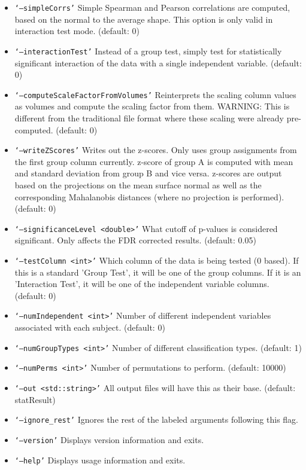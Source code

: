 \documentclass{InsightArticle}
\begin{document}
\begin{itemize}
     	\item \texttt{\small {`--simpleCorrs'}}  Simple Spearman and Pearson correlations are computed, based on the normal to the average shape. This option is only valid in interaction test mode. (default: 0)
     	\item \texttt{\small {`--interactionTest'}}  Instead of a group test, simply test for statistically significant interaction of the data with a single independent variable. (default:
     0)
     	\item \texttt{\small {`--computeScaleFactorFromVolumes'}}  Reinterprets the scaling column values as volumes and compute the scaling factor from them. WARNING: This is different from the traditional file format where these scaling were already pre-computed. (default: 0)
     	\item \texttt{\small {`--writeZScores'}}  Writes out the z-scores. Only uses group assignments from the first group column currently. z-score of group A is computed with mean and standard deviation from group B and vice versa. z-scores are output based on the projections on the mean surface normal as well as the corresponding Mahalanobis distances (where no projection is performed). (default: 0)
     	\item \texttt{\small {`--significanceLevel <double>'}}  What cutoff of p-values is considered significant. Only affects the FDR corrected results. (default: 0.05)
     	\item \texttt{\small {`--testColumn <int>'}}   Which column of the data is being tested (0 based). If this is a standard 'Group Test', it will be one of the group columns. If it is an 'Interaction Test', it will be one of the independent variable columns. (default: 0)
      	\item \texttt{\small {`--numIndependent <int>'}}  Number of different independent variables associated with each subject. (default: 0)
     	\item \texttt{\small {`--numGroupTypes <int>'}}  Number of different classification types. (default: 1)
     	\item \texttt{\small {`--numPerms <int>'}}  Number of permutations to perform. (default: 10000)
     	\item \texttt{\small {`--out <std::string>'}}  All output files will have this as their base. (default: statResult)
	\item \texttt{\small {`--ignore\_rest'}}  Ignores the rest of the labeled arguments following this flag.
	\item \texttt{\small {`--version'}}  Displays version information and exits.
	\item \texttt{\small {`--help'}}  Displays usage information and exits.
\end{itemize}
\end{document}
